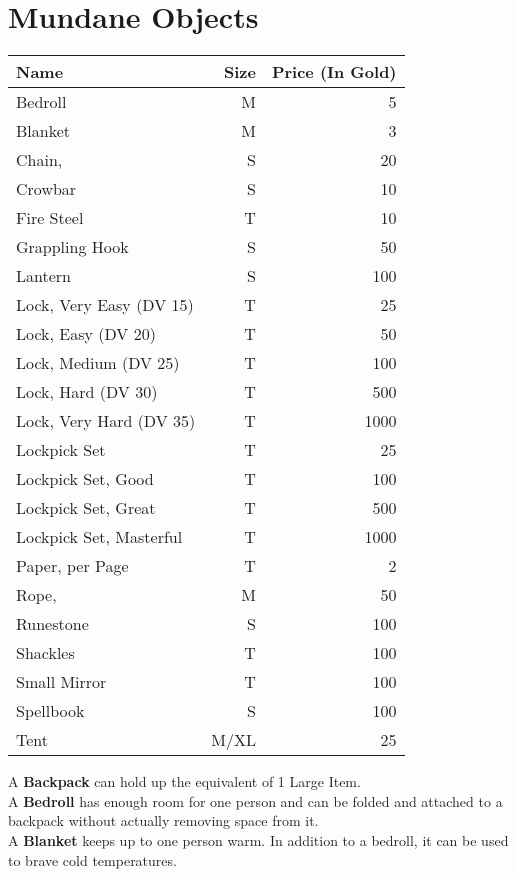 \section{Mundane Objects}\label{sec:mundaneObjects}
\begin{longtable}{l | r | r}
	Name & Size & Price (In Gold)\\ \hline
	Bedroll & M & 5\\
	Blanket & M & 3\\
	Chain, \passus{2} & S & 20\\
	Crowbar & S & 10\\
	Fire Steel & T & 10\\
	Grappling Hook & S & 50\\
	Lantern & S & 100\\
	Lock, Very Easy (DV 15) & T & 25\\
	Lock, Easy (DV 20) & T & 50\\
	Lock, Medium (DV 25) & T & 100\\
	Lock, Hard (DV 30) & T & 500\\
	Lock, Very Hard (DV 35) & T & 1000\\
	Lockpick Set & T & 25\\
	Lockpick Set, Good & T & 100\\
	Lockpick Set, Great & T & 500\\
	Lockpick Set, Masterful & T & 1000\\
	Paper, per Page & T & 2\\
	Rope, \passus{10} & M & 50\\
	Runestone & S & 100\\
	Shackles & T & 100\\
	Small Mirror & T & 100\\
	Spellbook & S & 100\\
	Tent & M/XL & 25\\
\end{longtable}

A \textbf{Backpack} can hold up the equivalent of 1 Large Item.\\

A \textbf{Bedroll} has enough room for one person and can be folded and attached to a backpack without actually removing space from it.\\

A \textbf{Blanket} keeps up to one person warm.
In addition to a bedroll, it can be used to brave cold temperatures.\\

